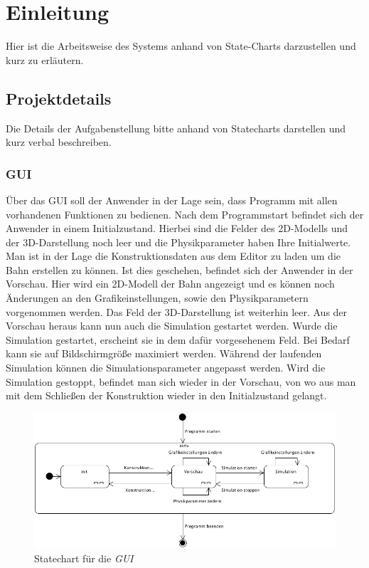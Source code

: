 
\chapter{Einleitung}
Hier ist die Arbeitsweise des Systems anhand von State-Charts darzustellen und
kurz zu erläutern.
\section{Projektdetails}
Die Details der Aufgabenstellung bitte anhand von Statecharts darstellen und
kurz verbal beschreiben.

\subsection{GUI}
Über das GUI soll der Anwender in der Lage sein, dass Programm mit allen vorhandenen Funktionen zu bedienen.
Nach dem Programmstart befindet sich der Anwender in einem Initialzustand. Hierbei sind die Felder des 2D-Modells und der 3D-Darstellung noch leer und die Physikparameter haben Ihre Initialwerte. Man ist in der Lage die Konstruktionsdaten aus dem Editor zu laden um die Bahn erstellen zu können.
Ist dies geschehen, befindet sich der Anwender in der Vorschau. Hier wird ein 2D-Modell der Bahn angezeigt und es können noch Änderungen an den Grafikeinstellungen, sowie den Physikparametern vorgenommen werden. Das Feld der 3D-Darstellung ist weiterhin leer. Aus der Vorschau heraus kann nun auch die Simulation gestartet werden.
Wurde die Simulation gestartet, erscheint sie in dem dafür vorgesehenem Feld. Bei Bedarf kann sie auf Bildschirmgröße maximiert werden. Während der laufenden Simulation können die Simulationsparameter angepasst werden.
Wird die Simulation gestoppt, befindet man sich wieder in der Vorschau, von wo aus man mit dem Schließen der Konstruktion wieder in den Initialzustand gelangt.

\begin{figure}
\includegraphics[width=\linewidth]{bilder/StateChart_GUI}
\caption{Statechart für die \textit{GUI}}
\end{figure}

